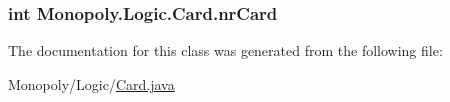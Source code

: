 \subsubsection[{\texorpdfstring{nr\+Card}{nrCard}}]{\setlength{\rightskip}{0pt plus 5cm}int Monopoly.\+Logic.\+Card.\+nr\+Card\hspace{0.3cm}{\ttfamily [private]}}\hypertarget{class_monopoly_1_1_logic_1_1_card_af79057d535b01c8a230e866dc0012c9b}{}\label{class_monopoly_1_1_logic_1_1_card_af79057d535b01c8a230e866dc0012c9b}


The documentation for this class was generated from the following file\+:\begin{DoxyCompactItemize}
\item 
Monopoly/\+Logic/\hyperlink{_card_8java}{Card.\+java}\end{DoxyCompactItemize}
